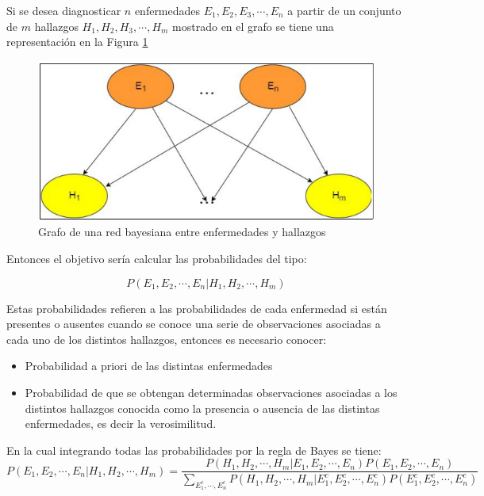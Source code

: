 Si se desea diagnosticar $n$ enfermedades ${E}_{1},{E}_{2},{E}_{3}, \cdots, {E}_{n}$ a partir de un conjunto de $m$ hallazgos ${H}_{1}, {H}_{2}, {H}_{3}, \cdots, {H}_{m}$ mostrado en el grafo se tiene una representación en la Figura \ref{figura:red_bayesiana}

\begin{figure}[htb]
\centering
\includegraphics[scale=0.7]{imagenes/redes_bayesianas.png}
\caption{Grafo de una red bayesiana entre enfermedades y hallazgos}
\label{figura:red_bayesiana}
\end{figure}

Entonces el objetivo sería calcular las probabilidades del tipo:

$$
P({E}_{1}, {E}_{2}, \cdots, {E}_{n} | {H}_{1}, {H}_{2}, \cdots, {H}_{m})
$$

Estas probabilidades refieren a las probabilidades de cada enfermedad si están presentes o ausentes cuando se conoce una serie de observaciones asociadas a cada uno de los distintos hallazgos, entonces es necesario conocer:

\begin{itemize}
\item Probabilidad a priori de las distintas enfermedades
\item Probabilidad de que se obtengan determinadas observaciones asociadas a los distintos hallazgos conocida como la presencia o ausencia de las distintas enfermedades, es decir la verosimilitud.
\end{itemize}
En la cual integrando todas las probabilidades por la regla de Bayes se tiene:
$$
P({E}_{1},{E}_{2},\cdots,{E}_{n}|{H}_{1},{H}_{2},\cdots,{H}_{m}) = \frac{P({H}_{1},{H}_{2},\cdots,{H}_{m}|{E}_{1},{E}_{2},\cdots,{E}_{n})P({E}_{1},{E}_{2},\cdots,{E}_{n})}{\sum\limits_{{E}_{1}^{c},\cdots,{E}_{n}^{c} }^{}P({H}_{1},{H}_{2},\cdots,{H}_{m}|{E}_{1}^{c},{E}_{2}^{c},\cdots,{E}_{n}^{c})P({E}_{1}^{c},{E}_{2}^{c},\cdots,{E}_{n}^{c})}
$$
